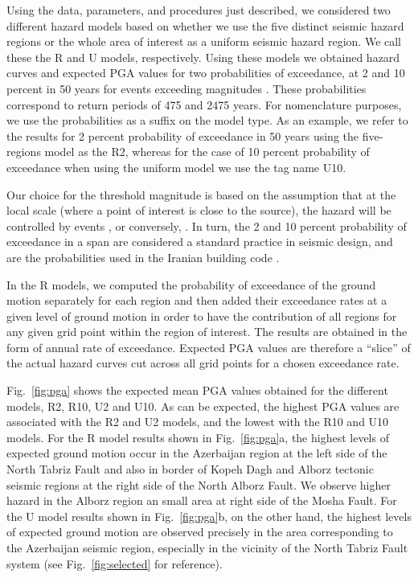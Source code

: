 Using the data, parameters, and procedures just described, we considered two different hazard models based on whether we use the five distinct seismic hazard regions or the whole area of interest as a uniform seismic hazard region. We call these the R and U models, respectively. Using these models we obtained hazard curves and expected PGA values for two probabilities of exceedance, at 2 and 10 percent in 50 years for events exceeding magnitudes . These probabilities correspond to return periods of 475 and 2475 years. For nomenclature purposes, we use the probabilities as a suffix on the model type. As an example, we refer to the results for 2 percent probability of exceedance in 50 years using the five-regions model as the R2, whereas for the case of 10 percent probability of exceedance when using the uniform model we use the tag name U10.

Our choice for the threshold magnitude is based on the assumption that at the local scale (where a point of interest is close to the source), the hazard will be controlled by events , or conversely, . In turn, the 2 and 10 percent probability of exceedance in a  span are considered a standard practice in seismic design, and are the probabilities used in the Iranian building code \citep{BHRC2014}.

In the R models, we computed the probability of exceedance of the ground motion separately for each region and then added their exceedance rates at a given level of ground motion in order to have the contribution of all regions for any given grid point within the region of interest. The results are obtained in the form of annual rate of exceedance. Expected PGA values are therefore a ``slice'' of the actual hazard curves cut across all grid points for a chosen exceedance rate.

Fig.~\ref{fig:pga} shows the expected mean PGA values obtained  for the different models, R2, R10, U2 and U10. As can be expected, the highest PGA values are associated with the R2 and U2 models, and the lowest with the R10 and U10 models. For the R model results shown in Fig.~\ref{fig:pga}a, the highest levels of expected ground motion occur in the Azerbaijan region at the left side of the North Tabriz Fault and also in border of Kopeh Dagh and Alborz tectonic seismic regions at the right side of the North Alborz Fault. We observe higher hazard in the Alborz region an small area at right side of the Mosha Fault. For the U model results shown in Fig.~\ref{fig:pga}b, on the other hand, the highest levels of expected ground motion are observed precisely in the area corresponding to the Azerbaijan seismic region, especially in the vicinity of the North Tabriz Fault system (see Fig.~\ref{fig:selected} for reference).

